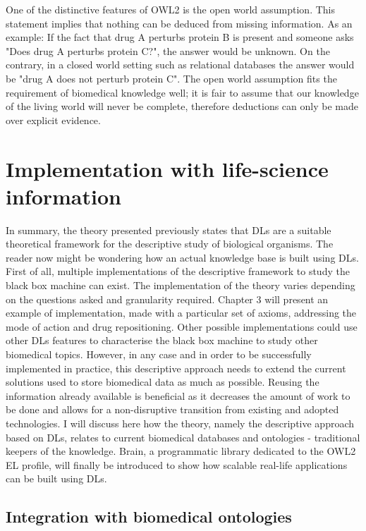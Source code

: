 One of the distinctive features of OWL2 is the open world assumption. This statement implies that nothing can be deduced from missing information. As an example: If the fact that drug A perturbs protein B is present and someone asks "Does drug A perturbs protein C?", the answer would be unknown. On the contrary, in a closed world setting such as relational databases the answer would be "drug A does not perturb protein C". The open world assumption fits the requirement of biomedical knowledge well; it is fair to assume that our knowledge of the living world will never be complete, therefore deductions can only be made over explicit evidence.

\section{Implementation with life-science information}

In summary, the theory presented previously states that DLs are a suitable theoretical framework for the descriptive study of biological organisms. The reader now might be wondering how an actual knowledge base is built using DLs. First of all, multiple implementations of the descriptive framework to study the black box machine can exist. The implementation of the theory varies depending on the questions asked and granularity required. Chapter 3 will present an example of implementation, made with a particular set of axioms, addressing the mode of action and drug repositioning. Other possible implementations could use other DLs features to characterise the black box machine to study other biomedical topics. However, in any case and in order to be successfully implemented in practice, this descriptive approach needs to extend the current solutions used to store biomedical data as much as possible. Reusing the information already available is beneficial as it decreases the amount of work to be done and allows for a non-disruptive transition from existing and adopted technologies. I will discuss here how the theory, namely the descriptive approach based on DLs, relates to current biomedical databases and ontologies - traditional keepers of the knowledge. Brain, a programmatic library dedicated to the OWL2 EL profile, will finally be introduced to show how scalable real-life applications can be built using DLs.

\subsection{Integration with biomedical ontologies}

